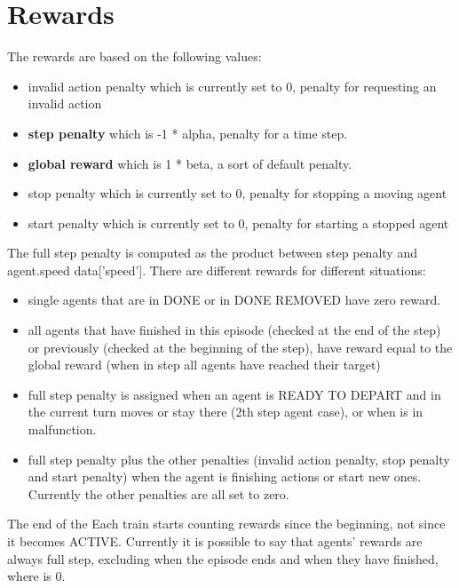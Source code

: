 \section{Rewards}
The rewards are based on the following values:
\begin{itemize}
\item invalid action penalty which is currently set to 0, penalty for requesting an invalid action
\item \textbf{step penalty} which is -1 * alpha, penalty for a time step.
\item \textbf{global reward} which is 1 * beta, a sort of default penalty.
\item stop penalty which is currently set to 0, penalty for stopping a moving agent
\item start penalty which is currently set to 0, penalty for starting a stopped agent
\end{itemize}
The full step penalty is computed as the product between step penalty and
agent.speed data[’speed’]. There are different rewards for different situations:
\begin{itemize}	
\item single agents that are in DONE or in DONE REMOVED have zero reward.
\item all agents that have finished in this episode (checked at the end of the step) or previously (checked at the beginning of the step), have reward equal to the global reward (when in step all agents have reached their target)
\item full step penalty is assigned when an agent is READY TO DEPART and in the current turn moves or stay there (2th step agent case), or when is in malfunction.
\item full step penalty plus the other penalties (invalid action penalty, stop penalty and start penalty) when the agent is finishing actions or start new ones. Currently the other penalties are all set to zero.
\end{itemize}
The end of the Each train starts counting rewards since the beginning, not since it becomes ACTIVE. Currently it is possible to say that agents’ rewards are always full step, excluding when the episode ends and when they have finished, where is 0.
